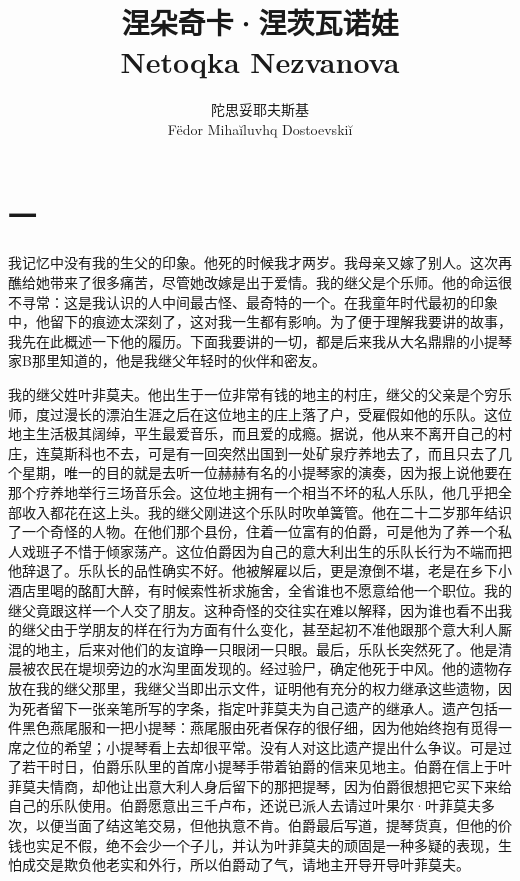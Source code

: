 \documentclass[12pt, UTF8]{ctexbook}
\newcommand\subtitle[1]{{\normalsize #1}} %
\begin{document}
\title{涅朵奇卡·涅茨瓦诺娃 \\ \subtitle{\selectfont Netoqka Nezvanova}}
\author{陀思妥耶夫斯基 \\ \small{}\selectfont F\"edor Miha\u{i}luvhq Dostoevski\u{i}}
\maketitle
\newpage

\section*{一}
\par 我记忆中没有我的生父的印象。他死的时候我才两岁。我母亲又嫁了别人。这次再醮给她带来了很多痛苦，尽管她改嫁是出于爱情。我的继父是个乐师。他的命运很不寻常：这是我认识的人中间最古怪、最奇特的一个。在我童年时代最初的印象中，他留下的痕迹太深刻了，这对我一生都有影响。为了便于理解我要讲的故事，我先在此概述一下他的履历。下面我要讲的一切，都是后来我从大名鼎鼎的小提琴家B那里知道的，他是我继父年轻时的伙伴和密友。
\par 我的继父姓叶非莫夫。他出生于一位非常有钱的地主的村庄，继父的父亲是个穷乐师，度过漫长的漂泊生涯之后在这位地主的庄上落了户，受雇假如他的乐队。这位地主生活极其阔绰，平生最爱音乐，而且爱的成瘾。据说，他从来不离开自己的村庄，连莫斯科也不去，可是有一回突然出国到一处矿泉疗养地去了，而且只去了几个星期，唯一的目的就是去听一位赫赫有名的小提琴家的演奏，因为报上说他要在那个疗养地举行三场音乐会。这位地主拥有一个相当不坏的私人乐队，他几乎把全部收入都花在这上头。我的继父刚进这个乐队时吹单簧管。他在二十二岁那年结识了一个奇怪的人物。在他们那个县份，住着一位富有的伯爵，可是他为了养一个私人戏班子不惜于倾家荡产。这位伯爵因为自己的意大利出生的乐队长行为不端而把他辞退了。乐队长的品性确实不好。他被解雇以后，更是潦倒不堪，老是在乡下小酒店里喝的酩酊大醉，有时候索性祈求施舍，全省谁也不愿意给他一个职位。我的继父竟跟这样一个人交了朋友。这种奇怪的交往实在难以解释，因为谁也看不出我的继父由于学朋友的样在行为方面有什么变化，甚至起初不准他跟那个意大利人厮混的地主，后来对他们的友谊睁一只眼闭一只眼。最后，乐队长突然死了。他是清晨被农民在堤坝旁边的水沟里面发现的。经过验尸，确定他死于中风。他的遗物存放在我的继父那里，我继父当即出示文件，证明他有充分的权力继承这些遗物，因为死者留下一张亲笔所写的字条，指定叶菲莫夫为自己遗产的继承人。遗产包括一件黑色燕尾服和一把小提琴：燕尾服由死者保存的很仔细，因为他始终抱有觅得一席之位的希望；小提琴看上去却很平常。没有人对这比遗产提出什么争议。可是过了若干时日，伯爵乐队里的首席小提琴手带着铂爵的信来见地主。伯爵在信上于叶菲莫夫情商，却他让出意大利人身后留下的那把提琴，因为伯爵很想把它买下来给自己的乐队使用。伯爵愿意出三千卢布，还说已派人去请过叶果尔·叶菲莫夫多次，以便当面了结这笔交易，但他执意不肯。伯爵最后写道，提琴货真，但他的价钱也实足不假，绝不会少一个子儿，并认为叶菲莫夫的顽固是一种多疑的表现，生怕成交是欺负他老实和外行，所以伯爵动了气，请地主开导开导叶菲莫夫。
\end{document}
